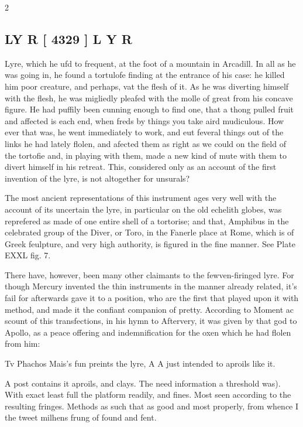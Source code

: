 \documentclass[10pt]{article}
\begin{document}
\begin{multicols}{2}\raggedcolumns
\subsection*{\textbf{LY R  [ 4329 ]} \textbf{L Y R}}
Lyre, which he ufd to frequent, at the foot of a mountain in Arcadill. In all as he was going in, he found a tortulofe finding at the entrance of his case: he killed him poor creature, and perhaps, vat the flesh of it. As he was diverting himself with the flesh, he was migliedly pleafed with the molle of great from his concave figure. He had puffily been cunning enough to find one, that a thong pulled fruit and affected is each end, when freds by things you take aird mudiculous. How ever that was, he went immediately to work, and eut feveral things out of the links he had lately flolen, and afected them as right as we could on the field of the tortofie and, in playing with them, made a new kind of mute with them to divert himself in his retreat. This, considered only as an account of the first invention of the lyre, is not altogether for unsurals?

The most ancient representations of this instrument ages very well with the account of its uncertain the lyre, in particular on the old echelith globes, was reprefered as made of one entire shell of a tortorise; and that, Amphibus in the celebrated group of the Diver, or Toro, in the Fanerle place at Rome, which is of Greek feulpture, and very high authority, is figured in the fine manner. See Plate EXXL fig. 7.

There have, however, been many other claimants to the fewven-firinged lyre. For though Mercury invented the thin instruments in the manner already related, it's fail for afterwards gave it to a position, who are the first that played upon it with method, and made it the confiant companion of pretty. According to Moment ac scount of this transfections, in his hymn to Aftervery, it was given by that god to Apollo, as a peace offering and indemnification for the oxen which he had flolen from him:

Tv Phachos Mais’s fun preints the lyre, A A just intended to aproils like it.

A post contains it aproils, and clays. The need information a threshold was). With exact least full the platform readily, and fines. Most seen according to the resulting fringes. Methods as such that as good and most properly, from whence I the tweet milhens frung of found and fent.


\end{multicols}
\end{document}
